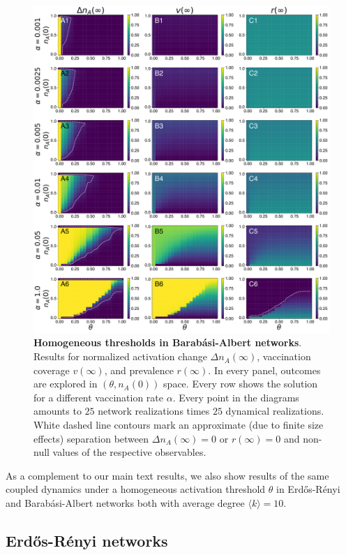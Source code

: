 \documentclass[
 reprint,
 amsmath,amssymb,
 aps,
]{revtex4-2}
\begin{document}
\begin{figure}[!ht]
\centering
\includegraphics[width=1.0\linewidth]{figure10.pdf}
\caption[Homogeneous thresholds in Barabási-Albert networks]{\textbf{Homogeneous thresholds in Barabási-Albert networks}. Results for normalized activation change $\Delta n_A(\infty)$, vaccination coverage $v(\infty)$, and prevalence $r(\infty)$. In every panel, outcomes are explored in $(\theta,n_A(0))$ space. Every row shows the solution for a different vaccination rate $\alpha$. Every point in the diagrams amounts to $25$ network realizations times $25$ dynamical realizations. White dashed line contours mark an approximate (due to finite size effects) separation between $\Delta n_A(\infty)=0$ or $r(\infty)=0$ and non-null values of the respective observables.}
\label{fig:supp_homo_ba}
\end{figure}

As a complement to our main text results, we also show results of the same coupled dynamics under a homogeneous activation threshold $\theta$ in Erd\H{o}s-Rényi and Barabási-Albert networks both with average degree $\langle k\rangle=10$.

\subsection{Erd\H{o}s-Rényi networks}
\label{subapp:homogeneous_erdosrenyi}
\end{document}
